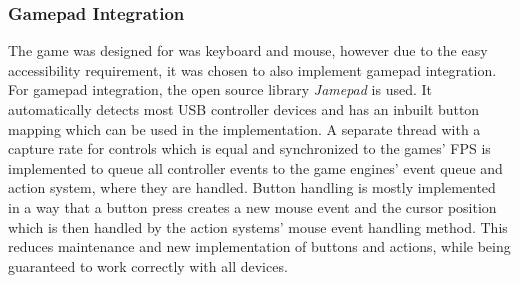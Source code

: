 \subsubsection{Gamepad Integration}\label{subsubsec:gamepad-integration}
The game was designed for was keyboard and mouse, however due to the easy accessibility requirement, it was chosen to also implement gamepad integration.
For gamepad integration, the open source library \textit{Jamepad} is used.
It automatically detects most USB controller devices and has an inbuilt button mapping which can be used in the implementation.
A separate thread with a capture rate for controls which is equal and synchronized to the games' FPS is implemented to queue all controller
events to the game engines' event queue and action system, where they are handled.
Button handling is mostly implemented in a way that a button press creates a new mouse event and the cursor position which is then handled by the action
systems' mouse event handling method.
This reduces maintenance and new implementation of buttons and actions, while being guaranteed to work correctly with all devices.


